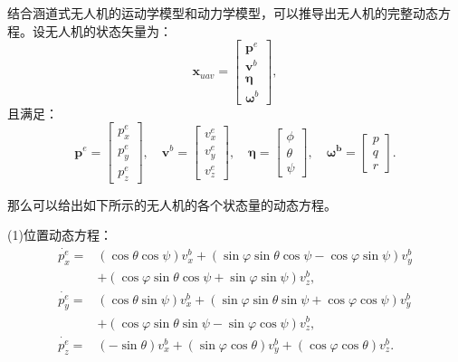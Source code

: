 结合涵道式无人机的运动学模型和动力学模型，可以推导出无人机的完整动态方程。设无人机的状态矢量为：
\begin{equation}
    \boldsymbol{x}_{uav} = 
    \begin{bmatrix}
        \boldsymbol{p}^{e} \\
        \boldsymbol{v}^{b} \\
        \boldsymbol{\eta} \\
        \boldsymbol{\omega}^{b}
    \end{bmatrix},
\end{equation}
且满足：
\begin{equation}
    \boldsymbol{p}^e = 
    \begin{bmatrix}
        p_x^e \\
        p_y^e \\
        p_z^e
    \end{bmatrix},
    \quad
    \boldsymbol{v}^b = 
    \begin{bmatrix}
        v_x^e \\
        v_y^e \\
        v_z^e
    \end{bmatrix}, 
    \quad
    \boldsymbol{\eta} = 
    \begin{bmatrix}
        \phi \\
        \theta \\
        \psi
    \end{bmatrix},
    \quad
    \boldsymbol{\omega^b} = 
    \begin{bmatrix}
        p \\
        q \\
        r
    \end{bmatrix}.
\end{equation}

那么可以给出如下所示的无人机的各个状态量的动态方程。

(1)位置动态方程：
\begin{equation}
    \begin{aligned}
        \dot{p_x^e} =& (\cos\theta\cos\psi) v_x^b + (\sin\varphi\sin\theta\cos\psi - \cos\varphi\sin\psi) v_y^b \\
        &+ 
        (\cos\varphi\sin\theta\cos\psi + \sin\varphi\sin\psi) v_z^b, \\
        \dot{p_y^e} =& (\cos\theta\sin\psi) v_x^b + (\sin\varphi\sin\theta\sin\psi + \cos\varphi\cos\psi) v_y^b \\
        &+ 
        (\cos\varphi\sin\theta\sin\psi - \sin\varphi\cos\psi) v_z^b, \\
        \dot{p_z^e} =& (-\sin\theta) v_x^b + (\sin\varphi\cos\theta) v_y^b + 
        (\cos\varphi\cos\theta) v_z^b.
    \end{aligned}
    \label{eq:p_dynamic}
\end{equation}

